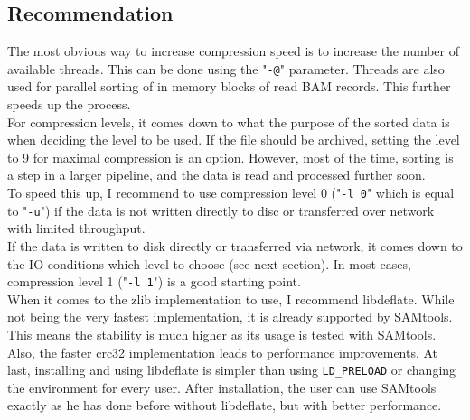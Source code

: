 \subsection{Recommendation}
The most obvious way to increase compression speed is to increase the number of available threads. This can be done using the "\texttt{-@}" parameter. Threads are also used for parallel sorting of in memory blocks of read BAM records. This further speeds up the process. \\
For compression levels, it comes down to what the purpose of the sorted data is when deciding the level to be used. 
If the file should be archived, setting the level to 9 for maximal compression is an option. However, most of the time, sorting is a step in a larger pipeline, and the data is read and processed further soon. \\
To speed this up, I recommend to use compression level 0 ("\texttt{-l 0}" which is equal to "\texttt{-u}") if the data is not written directly to  disc or transferred over network with limited throughput. \\
If the data is written to disk directly or transferred via network, it comes down to the IO conditions which level to choose (see next section). In most cases, compression level 1 ("\texttt{-l 1}") is a good starting point.\\
When it comes to the zlib implementation to use, I recommend libdeflate. While not being the very fastest implementation, it is already supported by SAMtools. This means the stability is much higher as its usage is tested with SAMtools. Also, the faster crc32 implementation leads to performance improvements. At last, installing and using libdeflate is simpler than using \texttt{LD\_PRELOAD} or changing the environment for every user. After installation, the user can use SAMtools exactly as he has done before without libdeflate, but with better performance.

